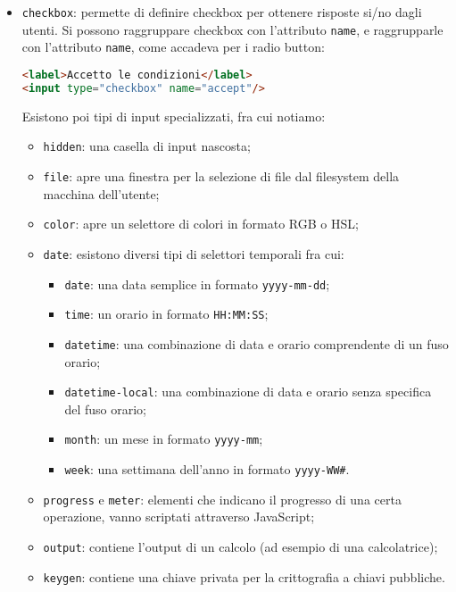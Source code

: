 \documentclass[a4paper,11pt]{article}
\begin{document}
\begin{itemize}
\begin{itemize}
		\item \lstinline|checkbox|: permette di definire checkbox per ottenere risposte si/no dagli utenti. Si possono raggruppare checkbox con l'attributo \lstinline|name|, e raggrupparle con l'attributo \lstinline|name|, come accadeva per i radio button:
\begin{lstlisting}[language=html, style=codestyle]	
<label>Accetto le condizioni</label>
<input type="checkbox" name="accept"/>
\end{lstlisting}

Esistono poi tipi di input specializzati, fra cui notiamo:
\begin{itemize}
	\item \lstinline|hidden|: una casella di input nascosta;
	\item \lstinline|file|: apre una finestra per la selezione di file dal filesystem della macchina dell'utente;
	\item \lstinline|color|: apre un selettore di colori in formato RGB o HSL;
	\item \lstinline|date|: esistono diversi tipi di selettori temporali fra cui:
		\begin{itemize}
			\item \lstinline|date|: una data semplice in formato \lstinline|yyyy-mm-dd|;
			\item \lstinline|time|: un orario in formato \lstinline|HH:MM:SS|;
			\item \lstinline|datetime|: una combinazione di data e orario comprendente di un fuso orario;
			\item \lstinline|datetime-local|: una combinazione di data e orario senza specifica del fuso orario;
			\item \lstinline|month|: un mese in formato \lstinline|yyyy-mm|;
			\item \lstinline|week|: una settimana dell'anno in formato \lstinline|yyyy-WW#|.
		\end{itemize}
	\item \lstinline|progress| e \lstinline|meter|: elementi che indicano il progresso di una certa operazione, vanno scriptati attraverso JavaScript;
	\item \lstinline|output|: contiene l'output di un calcolo (ad esempio di una calcolatrice);
	\item \lstinline|keygen|: contiene una chiave privata per la crittografia a chiavi pubbliche.
\end{itemize}

\end{itemize}


\end{itemize}
\end{document}
